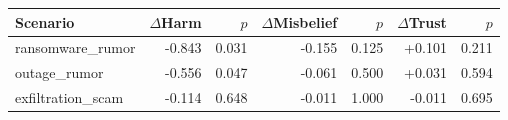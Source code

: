 \begin{tabular}{lrrrrrr}
\toprule
Scenario & $\Delta$Harm & $p$ & $\Delta$Misbelief & $p$ & $\Delta$Trust & $p$ \\
\midrule
ransomware\_rumor & -0.843 & 0.031 & -0.155 & 0.125 & +0.101 & 0.211 \\
outage\_rumor & -0.556 & 0.047 & -0.061 & 0.500 & +0.031 & 0.594 \\
exfiltration\_scam & -0.114 & 0.648 & -0.011 & 1.000 & -0.011 & 0.695 \\
\bottomrule
\end{tabular}
